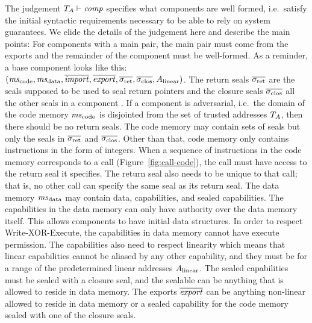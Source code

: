 \documentclass[acmsmall,review,showframe]{acmart}\settopmatter{printfolios=true,printccs=false,printacmref=false}
\renewcommand{\comp}{\var{comp}}
\newcommand{\wdjud}[2][ ]{#1 \vdash #2}
\begin{document}
The judgement $\wdjud[\ta]{\comp}$ specifies what components are well formed, i.e.\ satisfy the initial syntactic requirements necessary to be able to rely on system guarantees.
We elide the details of the judgement here and describe the main points:
For components with a main pair, the main pair must come from the exports and the remainder of the component must be well-formed.
As a reminder, a base component looks like this: $(\mscode,\msdata,\overline{\var{import}},\overline{\var{export}},\sigrets,\sigcloss,A_\linear)$.
The return seals $\sigrets$ are the seals supposed to be used to seal return pointers and the closure seals $\sigcloss$ all the other seals in a component .
If a component is adversarial, i.e.\ the domain of the code memory $\mscode$ is disjointed from the set of trusted addresses $T_{A}$, then there should be no return seals.
The code memory may contain sets of seals but only the seals in $\sigrets$ and $\sigcloss$.
Other than that, code memory only contains instructions in the form of integers.
When a sequence of instructions in the code memory corresponds to a call (Figure~\ref{fig:call-code}), the call must have access to the return seal it specifies.
The return seal also needs to be unique to that call; that is, no other call can specify the same seal as its return seal.
The data memory $\msdata$ may contain data, capabilities, and sealed capabilities.
The capabilities in the data memory can only have authority over the data memory itself.
This allows components to have initial data structures.
In order to respect Write-XOR-Execute, the capabilities in data memory cannot have execute permission.
The capabilities also need to respect linearity which means that linear capabilities cannot be aliased by any other capability, and they must be for a range of the predetermined linear addresses $A_{\mathrm{linear}}$.
The sealed capabilities must be sealed with a closure seal, and the sealable can be anything that is allowed to reside in data memory.
The exports $\overline{\mathit{export}}$ can be anything non-linear allowed to reside in data memory or a sealed capability for the code memory sealed with one of the closure seals.
\end{document}
